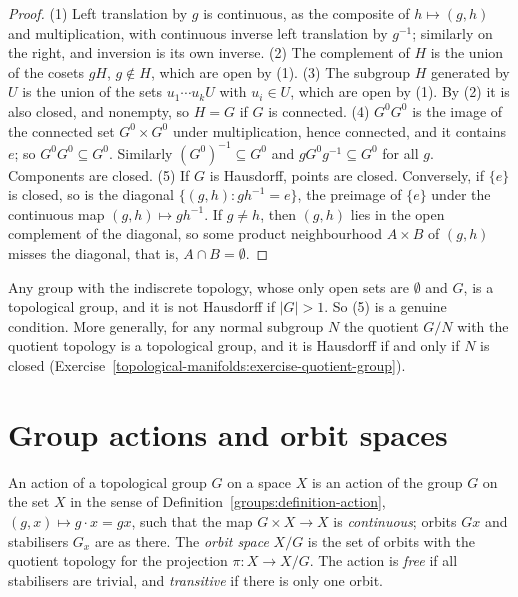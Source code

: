 \begin{proof}
(1) Left translation by $g$ is continuous, as the composite of $h \mapsto (g, h)$ and multiplication, with continuous inverse left translation by $g^{-1}$; similarly on the right, and inversion is its own inverse. (2) The
complement of $H$ is the union of the cosets $gH$, $g \notin H$, which are open by (1). (3) The subgroup $H$ generated by $U$ is the union of the sets $u_1 \cdots u_kU$ with $u_i \in U$, which are open by (1). By (2) it is
also closed, and nonempty, so $H = G$ if $G$ is connected. (4) $G^0G^0$ is the image of the connected set $G^0 \times G^0$ under multiplication, hence connected, and it contains $e$; so $G^0G^0 \subseteq G^0$.
Similarly $(G^0)^{-1} \subseteq G^0$ and $gG^0g^{-1} \subseteq G^0$ for all $g$. Components are closed. (5) If $G$ is Hausdorff, points are closed. Conversely, if $\{e\}$ is closed, so is the diagonal
$\{(g, h) : gh^{-1} = e\}$, the preimage of $\{e\}$ under the continuous map $(g, h) \mapsto gh^{-1}$. If $g \neq h$, then $(g, h)$ lies in the open complement of the diagonal, so some product neighbourhood $A \times B$ of
$(g, h)$ misses the diagonal, that is, $A \cap B = \emptyset$.
\end{proof}

\begin{counterexample}\label{topological-manifolds:counterexample-non-hausdorff-group}
Any group with the indiscrete topology, whose only open sets are $\emptyset$ and $G$, is a topological group, and it is not Hausdorff if $|G| > 1$. So (5) is a genuine condition. More generally, for any normal subgroup
$N$ the quotient $G/N$ with the quotient topology is a topological group, and it is Hausdorff if and only if $N$ is closed (Exercise~\ref{topological-manifolds:exercise-quotient-group}).
\end{counterexample}

\section{Group actions and orbit spaces}\label{topological-manifolds:section-actions}

\begin{definition}\label{topological-manifolds:definition-action}
An action of a topological group $G$ on a space $X$ is an action of the group $G$ on the set $X$ in the sense of Definition~\ref{groups:definition-action}, $(g, x) \mapsto g \cdot x = gx$, such that the map
$G \times X \to X$ is \emph{continuous}; orbits $Gx$ and stabilisers $G_x$ are as there. The \emph{orbit space} $X/G$ is the set of orbits with the quotient topology for the projection $\pi \colon X \to X/G$. The action is \emph{free} if all stabilisers are
trivial, and \emph{transitive} if there is only one orbit.
\end{definition}

